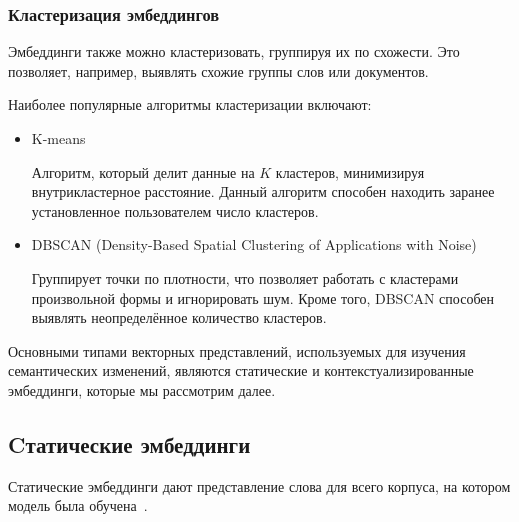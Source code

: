 \documentclass[LI,VKR]{HSEUniversity}
\begin{document}
\subsubsection*{Кластеризация эмбеддингов}

Эмбеддинги также можно кластеризовать, группируя их по схожести.
Это позволяет, например, выявлять схожие группы слов или документов.

Наиболее популярные алгоритмы кластеризации включают:

\begin{itemize}
    \item K-means

Алгоритм, который делит данные на \(K\) кластеров, минимизируя внутрикластерное расстояние.
Данный алгоритм способен находить заранее установленное пользователем число кластеров.
    \item DBSCAN (Density-Based Spatial Clustering of Applications with Noise)

Группирует точки по плотности, что позволяет работать с кластерами произвольной формы и игнорировать шум.
Кроме того, DBSCAN способен выявлять неопределённое количество кластеров.
\end{itemize}

Основными типами векторных представлений, используемых для изучения семантических изменений,
являются статические и контекстуализированные эмбеддинги,
которые мы рассмотрим далее.

\subsection{Cтатические эмбеддинги}


Статические эмбеддинги дают представление слова для всего корпуса,
на котором модель была обучена~\cite{TahmasebiComputationalApproachesToSemanticChange}.
\end{document}
